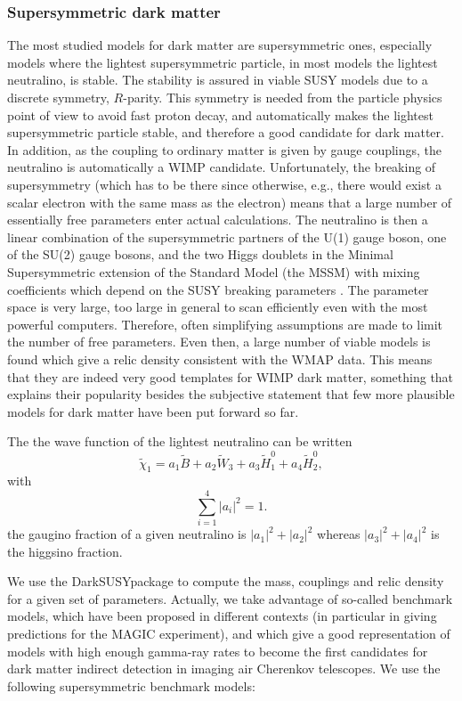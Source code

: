 \documentclass[10pt,aps,pra,reprint,amsmath,amsfonts,amssymb,showpacs]{revtex4-1}
\newcommand{\ds}{{\sc DarkSUSY}}
\begin{document}
\subsubsection{Supersymmetric dark matter}
The most studied models for dark matter are supersymmetric ones,
especially models where the lightest supersymmetric particle, in most
models the lightest neutralino, is stable. The stability is assured in
viable SUSY models due to a discrete symmetry, $R$-parity. This
symmetry is needed from the particle physics point of view to avoid
fast proton decay, and automatically makes the lightest supersymmetric
particle stable, and therefore a good candidate for dark matter. In
addition, as the coupling to ordinary matter is given by gauge
couplings, the neutralino is automatically a WIMP
candidate. Unfortunately, the breaking of supersymmetry (which has to
be there since otherwise, e.g., there would exist a scalar electron
with the same mass as the electron) means that a large number of
essentially free parameters enter actual calculations.  The neutralino
is then a linear combination of the supersymmetric partners of the
U(1) gauge boson, one of the SU(2) gauge bosons, and the two Higgs
doublets in the Minimal Supersymmetric extension of the Standard Model
(the MSSM) with mixing coefficients which depend on the SUSY breaking
parameters \cite{1984NuPhB.238..453E}. The parameter space is very
large, too large in general to scan efficiently even with the most
powerful computers. Therefore, often simplifying assumptions are made
to limit the number of free parameters. Even then, a large number of
viable models is found which give a relic density consistent with the
WMAP data. This means that they are indeed very good templates for
WIMP dark matter, something that explains their popularity besides the
subjective statement that few more plausible models for dark matter
have been put forward so far.

The the wave function of the lightest neutralino can be written
$$
\tilde\chi_1=a_1\tilde B+a_2\tilde W_3+a_3 \tilde H_1^0+a_4\tilde H_2^0,
$$
with 
$$
\sum_{i=1}^4 |a_i|^2=1.
$$
the gaugino fraction of a given neutralino is $|a_1|^2+|a_2|^2$ whereas $|a_3|^2+|a_4|^2$ is the higgsino fraction. 


We use the \ds package \cite{ds} to compute the mass, couplings and
relic density for a given set of parameters.  Actually, we take
advantage of so-called benchmark models, which have been proposed in
different contexts (in particular in \cite{Bringmann:2008kj} giving
predictions for the MAGIC experiment), and which give a good
representation of models with high enough gamma-ray rates to become
the first candidates for dark matter indirect detection in imaging air
Cherenkov telescopes. We use the following supersymmetric benchmark
models:
\end{document}
